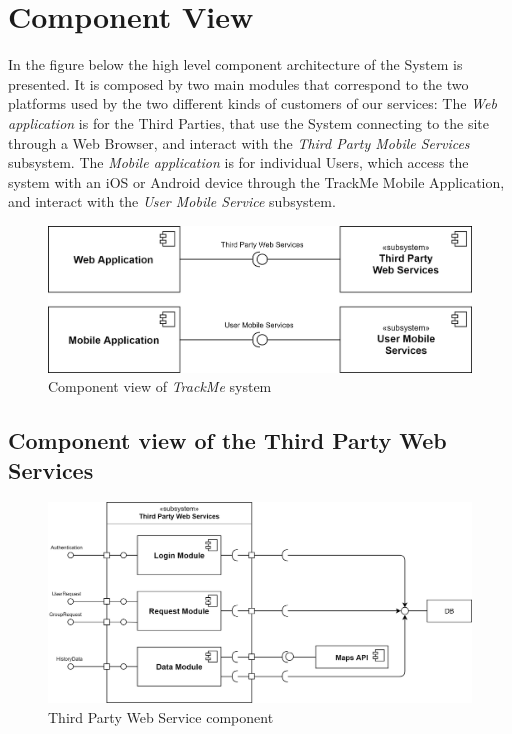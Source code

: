 \section{Component View}
In the figure below the high level component architecture of the System is presented. It is composed by two main modules that correspond to the two platforms used by the two different kinds of customers of our services: 
The \emph{Web application} is for the Third Parties, that use the System connecting to the site through a Web Browser, and interact with the \emph{Third Party Mobile Services} subsystem. The \emph{Mobile application} is for individual Users, which access the system with an iOS or Android device through the TrackMe Mobile Application, and interact with the \emph{User Mobile Service} subsystem.

\vspace{6mm}

\begin{figure}[H]

    \centering
    \includegraphics[scale=0.2]{./Pictures/component.png}
    \caption{Component view of \emph{TrackMe} system}
    
\end{figure}

\subsection{Component view of the Third Party Web Services}
\begin{figure}[H]

    \centering
    \includegraphics[scale=0.18]{./Pictures/thirdPartyServicesDiagram.png}
    \caption{Third Party Web Service component}
    
\end{figure}
    
